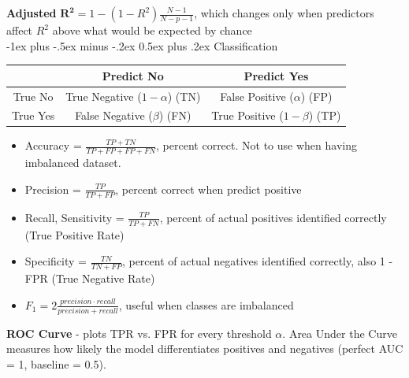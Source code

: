 \documentclass[10pt,landscape]{article}
\makeatletter
\renewcommand{\subsection}{\@startsection{subsection}{2}{0mm}%
                                {-1ex plus -.5ex minus -.2ex}%
                                {0.5ex plus .2ex}%
                                {\normalfont\normalsize\bfseries}}
\makeatother
\begin{document}
\begin{multicols}{3}
    \textbf{Adjusted} $\boldsymbol{R^2} = 1 - (1-R^2)\frac{N-1}{N-p-1}$, which changes only when predictors affect $R^2$ above what would be expected by chance\\

    \renewcommand{\tabcolsep}{5pt}
    \subsection{Classification}
    \begin{center}
        \footnotesize
        \begin{tabular}{ |c|c|c| }
            \hline
                     & Predict No                        & Predict Yes \\
            \hline
            True No  & \thead{True Negative ($1-\alpha$)               \\(TN)}& \thead{False Positive ($\alpha$) \\ (FP) } \\
            True Yes & \thead{False Negative ($\beta$)                 \\ (FN)}& \thead{True Positive ($1-\beta$) \\ (TP) } \\
            \hline
        \end{tabular}
    \end{center}
    \vspace{-1mm}
    \begin{itemize}[label={--},leftmargin=4mm]
        \vspace{-1mm}
        \itemsep -.4mm
        \item Accuracy = $\frac{TP + TN}{TP + FP + FP + FN}$, percent correct. Not to use when having imbalanced dataset.
        \item Precision = $\frac{TP}{TP + FP}$, percent correct when predict positive
        \item Recall, Sensitivity = $\frac{TP}{TP + FN}$, percent of actual positives identified correctly (True Positive Rate)
        \item Specificity = $\frac{TN}{TN + FP}$, percent of actual negatives identified correctly, also 1 - FPR (True Negative Rate)
        \item $F_1 = 2\frac{precision\cdot recall}{precision + recall}$, useful when classes are imbalanced
    \end{itemize}


    \textbf{ROC Curve} - plots TPR vs. FPR for every threshold $\alpha$. Area Under the Curve  measures how likely the model differentiates positives and negatives (perfect AUC = 1, baseline = 0.5).


\end{multicols}
\end{document}
